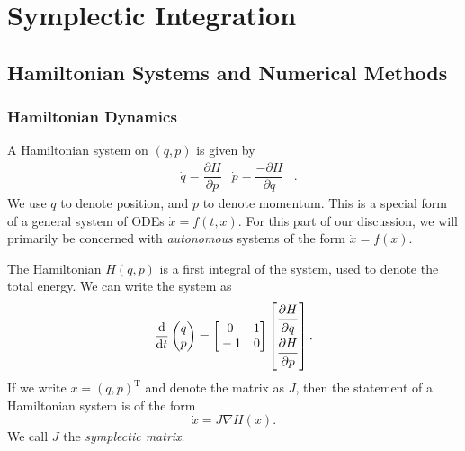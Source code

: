 

\chapter{Symplectic Integration}

\section{Hamiltonian Systems and Numerical Methods}

\subsection{Hamiltonian Dynamics}

A Hamiltonian system on $(q,p)$ is given by
\begin{align*}
	&\dot{q} = \dfrac{\partial H}{\partial p}
	&
	\dot{p} = \dfrac{-\partial H}{\partial q}&.	
\end{align*}
We use $q$ to denote position, and $p$ to denote momentum.
This is a special form of a general system of ODEs $\dot{x} = f(t,x)$.
For this part of our discussion, we will primarily be concerned with \textit{autonomous} systems of the form $\dot{x} = f(x)$.

The Hamiltonian $H(q,p)$ is a first integral of the system, used to denote the total energy.
We can write the system as
\begin{equation}
	\dfrac{\mathrm{d}}{\mathrm{d}t}\begin{pmatrix}
		q \\
		p
	\end{pmatrix} = \begin{bmatrix}
		\strut 0 & \strut 1 \\
		\strut -1 & \strut 0
	\end{bmatrix}\begin{bmatrix}
	\dfrac{\strut \partial H}{\strut\partial q} \\
	\dfrac{\strut \partial H}{\strut\partial p}
	\end{bmatrix}.
\end{equation}
If we write $x = (q,p)^\mathrm{T}$ and denote the matrix as $J$,
then the statement of a Hamiltonian system is of the form 
\begin{equation}
	{\dot{x}} = {J}\nabla H({x}).
	\label{eqn:hdyn}
\end{equation}
We call $J$ the \textit{symplectic matrix}.

